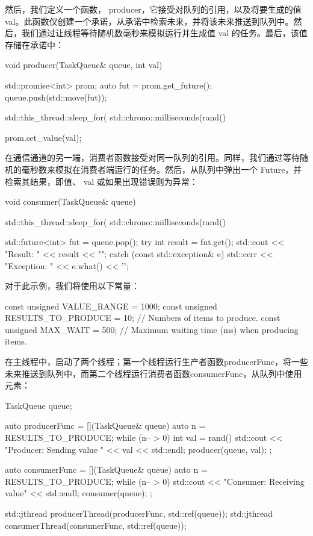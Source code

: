 然后，我们定义一个函数， producer，它接受对队列的引用，以及将要生成的值 val。此函数仅创建一个承诺，从承诺中检索未来，并将该未来推送到队列中。然后，我们通过让线程等待随机数毫秒来模拟运行并生成值 val 的任务。最后，该值存储在承诺中：

\begin{cpp}
void producer(TaskQueue& queue, int val) {
    std::promise<int> prom;
    auto fut = prom.get_future();
    queue.push(std::move(fut));

    std::this_thread::sleep_for(
            std::chrono::milliseconds(rand() %

    prom.set_value(val);
}
\end{cpp}

在通信通道的另一端，消费者函数接受对同一队列的引用。同样，我们通过等待随机的毫秒数来模拟在消费者端运行的任务。然后，从队列中弹出一个 Future，并检索其结果，即值、 val 或如果出现错误则为异常：

\begin{cpp}
void consumer(TaskQueue& queue) {
    std::this_thread::sleep_for(
            std::chrono::milliseconds(rand() %

    std::future<int> fut = queue.pop();
    try {
        int result = fut.get();
        std::cout << "Result: " << result << "\n";
    } catch (const std::exception& e) {
        std::cerr << "Exception: " << e.what() << '\n';
    }
}
\end{cpp}

对于此示例，我们将使用以下常量：

\begin{cpp}
const unsigned VALUE_RANGE = 1000;
const unsigned RESULTS_TO_PRODUCE = 10; // Numbers of items to produce.
const unsigned MAX_WAIT = 500; // Maximum waiting time (ms) when producing items.
\end{cpp}

在主线程中，启动了两个线程；第一个线程运行生产者函数producerFunc，将一些未来推送到队列中，而第二个线程运行消费者函数consumerFunc，从队列中使用元素：

\begin{cpp}
TaskQueue queue;

auto producerFunc = [](TaskQueue& queue) {
    auto n = RESULTS_TO_PRODUCE;
    while (n-- > 0) {
        int val = rand() %
        std::cout << "Producer: Sending value " << val
                  << std::endl;
        producer(queue, val);
    }
};

auto consumerFunc = [](TaskQueue& queue) {
    auto n = RESULTS_TO_PRODUCE;
    while (n-- > 0) {
        std::cout << "Consumer: Receiving value"
                  << std::endl;
        consumer(queue);
    }
};

std::jthread producerThread(producerFunc, std::ref(queue));
std::jthread consumerThread(consumerFunc, std::ref(queue));
\end{cpp}

